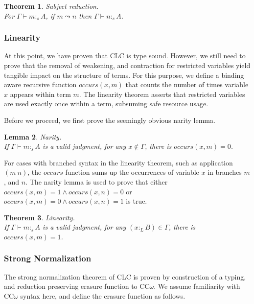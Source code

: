 \documentclass{article}
\newtheorem{theorem}{Theorem}[section]
\newtheorem{lemma}[theorem]{Lemma}
\theoremstyle{definition}
\newcommand{\ltype}{:_{\scriptscriptstyle L}}
\newcommand{\stype}[1]{:_#1}
\newcommand{\pstep}{\leadsto}
\begin{document}
  \begin{theorem} Subject reduction. \\
    For $\Gamma \vdash m \stype{s} A$, if $m \pstep n$ then $\Gamma \vdash n \stype{s} A$.
  \end{theorem}

  \subsubsection{Linearity}
  At this point, we have proven that CLC is type sound. However, we still need to prove that the removal of weakening, and contraction for restricted variables yield tangible impact on the structure of terms. For this purpose, we define a binding aware recursive function $occurs(x, m)$ that counts the number of times variable $x$ appears within term $m$. The linearity theorem asserts that restricted variables are used exactly once within a term, subsuming safe resource usage.

  Before we proceed, we first prove the seemingly obvious narity lemma. 

  \begin{lemma} Narity. \\
    If $\Gamma \vdash m \stype{s} A$ is a valid judgment, for any $x \notin \Gamma$, there is $occurs(x, m) = 0$.
  \end{lemma}

  For cases with branched syntax in the linearity theorem, such as application $(m\ n)$, the $occurs$ function sums up the occurrences of variable $x$ in branches $m$, and $n$. The narity lemma is used to prove that either $occurs(x, m) = 1 \wedge occurs(x, n) = 0$ or $occurs(x, m) = 0 \wedge occurs(x, n) = 1$ is true.

  \begin{theorem} Linearity. \\
    If $\Gamma \vdash m \stype{s} A$ is a valid judgment, for any $(x \ltype B) \in \Gamma$, there is $occurs(x, m) = 1$.
  \end{theorem}

  \subsubsection{Strong Normalization}
  The strong normalization theorem of CLC is proven by construction of a typing, and reduction preserving erasure function to CC$\omega$. We assume familiarity with CC$\omega$ syntax here, and define the erasure function as follows.
\end{document}
